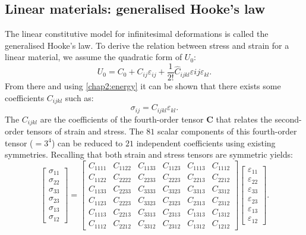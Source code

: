 	\subsection{Linear materials: generalised Hooke's law} \label{chap2:Hooke}
The linear constitutive model for infinitesimal deformations is called the generalised Hooke's law. To derive the relation between stress and strain for a linear material, we assume the quadratic form of $U_0$:
\begin{equation}
U_0 = C_0 + C_{ij}\varepsilon_{ij} + \frac{1}{2!}\hat{C}_{ijkl}\varepsilon{ij}\varepsilon_{kl}.
\end{equation}
From there and using \eqref{chap2:energy} it can be shown that there exists some coefficients $C_{ijkl}$ such as:
\begin{equation}
\sigma_{ij} = C_{ijkl} \varepsilon_{kl}.
\end{equation}
The $C_{ijkl}$ are the coefficients of the fourth-order tensor $\mathbf{C}$ that relates the second-order tensors of strain and stress. The $81$ scalar components of this fourth-order tensor ($=3^4$) can be reduced to $21$ independent coefficients using existing symmetries. Recalling that both strain and stress tensors are symmetric yields:
\begin{equation}
	\begin{bmatrix}
		\sigma_{11} \\
		\sigma_{22} \\
		\sigma_{33} \\
		\sigma_{23} \\
		\sigma_{13} \\
		\sigma_{12}
	\end{bmatrix}
= 
	\begin{bmatrix}
		C_{1111} & C_{1122} & C_{1133} & C_{1123} & C_{1113} & C_{1112} \\
		C_{1122} & C_{2222} & C_{2233} & C_{2223} & C_{2213} & C_{2212} \\
		C_{1133} & C_{2233} & C_{3333} & C_{3323} & C_{3313} & C_{3312} \\
		C_{1123} & C_{2223} & C_{3323} & C_{2323} & C_{2313} & C_{2312} \\
		C_{1113} & C_{2213} & C_{3313} & C_{2313} & C_{1313} & C_{1312} \\
		C_{1112} & C_{2212} & C_{3312} & C_{2312} & C_{1312} & C_{1212}
	\end{bmatrix}
	\begin{bmatrix}
		\varepsilon_{11} \\
		\varepsilon_{22} \\
		\varepsilon_{33} \\
		\varepsilon_{23} \\
		\varepsilon_{13} \\
		\varepsilon_{12}
	\end{bmatrix}
	.
\end{equation}

